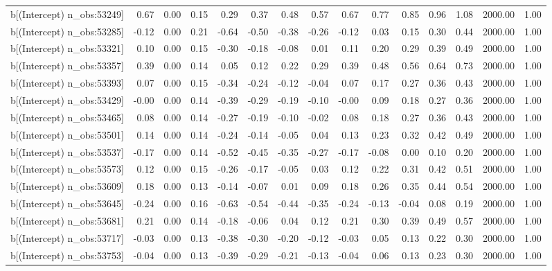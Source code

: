 \begin{table}[ht]
\begin{tabular}{rrrrrrrrrrrrrrr}
  b[(Intercept) n\_obs:53249] & 0.67 & 0.00 & 0.15 & 0.29 & 0.37 & 0.48 & 0.57 & 0.67 & 0.77 & 0.85 & 0.96 & 1.08 & 2000.00 & 1.00 \\ 
  b[(Intercept) n\_obs:53285] & -0.12 & 0.00 & 0.21 & -0.64 & -0.50 & -0.38 & -0.26 & -0.12 & 0.03 & 0.15 & 0.30 & 0.44 & 2000.00 & 1.00 \\ 
  b[(Intercept) n\_obs:53321] & 0.10 & 0.00 & 0.15 & -0.30 & -0.18 & -0.08 & 0.01 & 0.11 & 0.20 & 0.29 & 0.39 & 0.49 & 2000.00 & 1.00 \\ 
  b[(Intercept) n\_obs:53357] & 0.39 & 0.00 & 0.14 & 0.05 & 0.12 & 0.22 & 0.29 & 0.39 & 0.48 & 0.56 & 0.64 & 0.73 & 2000.00 & 1.00 \\ 
  b[(Intercept) n\_obs:53393] & 0.07 & 0.00 & 0.15 & -0.34 & -0.24 & -0.12 & -0.04 & 0.07 & 0.17 & 0.27 & 0.36 & 0.43 & 2000.00 & 1.00 \\ 
  b[(Intercept) n\_obs:53429] & -0.00 & 0.00 & 0.14 & -0.39 & -0.29 & -0.19 & -0.10 & -0.00 & 0.09 & 0.18 & 0.27 & 0.36 & 2000.00 & 1.00 \\ 
  b[(Intercept) n\_obs:53465] & 0.08 & 0.00 & 0.14 & -0.27 & -0.19 & -0.10 & -0.02 & 0.08 & 0.18 & 0.27 & 0.36 & 0.43 & 2000.00 & 1.00 \\ 
  b[(Intercept) n\_obs:53501] & 0.14 & 0.00 & 0.14 & -0.24 & -0.14 & -0.05 & 0.04 & 0.13 & 0.23 & 0.32 & 0.42 & 0.49 & 2000.00 & 1.00 \\ 
  b[(Intercept) n\_obs:53537] & -0.17 & 0.00 & 0.14 & -0.52 & -0.45 & -0.35 & -0.27 & -0.17 & -0.08 & 0.00 & 0.10 & 0.20 & 2000.00 & 1.00 \\ 
  b[(Intercept) n\_obs:53573] & 0.12 & 0.00 & 0.15 & -0.26 & -0.17 & -0.05 & 0.03 & 0.12 & 0.22 & 0.31 & 0.42 & 0.51 & 2000.00 & 1.00 \\ 
  b[(Intercept) n\_obs:53609] & 0.18 & 0.00 & 0.13 & -0.14 & -0.07 & 0.01 & 0.09 & 0.18 & 0.26 & 0.35 & 0.44 & 0.54 & 2000.00 & 1.00 \\ 
  b[(Intercept) n\_obs:53645] & -0.24 & 0.00 & 0.16 & -0.63 & -0.54 & -0.44 & -0.35 & -0.24 & -0.13 & -0.04 & 0.08 & 0.19 & 2000.00 & 1.00 \\ 
  b[(Intercept) n\_obs:53681] & 0.21 & 0.00 & 0.14 & -0.18 & -0.06 & 0.04 & 0.12 & 0.21 & 0.30 & 0.39 & 0.49 & 0.57 & 2000.00 & 1.00 \\ 
  b[(Intercept) n\_obs:53717] & -0.03 & 0.00 & 0.13 & -0.38 & -0.30 & -0.20 & -0.12 & -0.03 & 0.05 & 0.13 & 0.22 & 0.30 & 2000.00 & 1.00 \\ 
  b[(Intercept) n\_obs:53753] & -0.04 & 0.00 & 0.13 & -0.39 & -0.29 & -0.21 & -0.13 & -0.04 & 0.06 & 0.13 & 0.23 & 0.30 & 2000.00 & 1.00 \\ 

\end{tabular}
\end{table}
